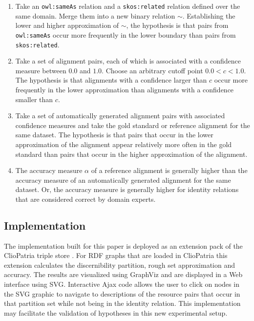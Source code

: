 \begin{enumerate}
\item Take an \verb|owl:sameAs| relation and a \verb|skos:related|
        relation defined over the same domain.
      Merge them into a new binary relation $\sim$.
      Establishing the lower and higher approximation of $\sim$,
        the hypothesis is that pairs from \verb|owl:sameAs| occur more
        frequently in the lower boundary than pairs from \verb|skos:related|.
\item Take a set of alignment pairs, each of which is associated with
        a confidence measure between $0.0$ and $1.0$.
      Choose an arbitrary cutoff point $0.0<c<1.0$.
      The hypothesis is that alignments with a confidence larger than $c$
        occur more frequently in the lower approximation than alignments
        with a confidence smaller than $c$.
\item Take a set of automatically generated alignment pairs with
        associated confidence measures and take the gold standard or
        reference alignment for the same dataset.
      The hypothesis is that pairs that occur in the lower approximation
        of the alignment appear relatively more often in the gold standard
        than pairs that occur in the higher approximation of the alignment.
\item The accuracy measure $\alpha$ of a reference alignment is generally
        higher than the accuracy measure of an automatically generated
        alignment for the same dataset.
      Or, the accuracy measure is generally higher for identity relations
        that are considered correct by domain experts.
\end{enumerate}

\subsection{Implementation}
\label{sec:implementation}

The implementation built for this paper is deployed as an extension pack
  of the ClioPatria triple store \cite{schreiber_2006}.
For RDF graphs that are loaded in ClioPatria this extension calculates
  the discernibility partition, rough set approximation and accuracy.
The results are visualized using GraphViz and are displayed in a
  Web interface using SVG.
Interactive Ajax code allows the user to click on nodes in the SVG graphic
  to navigate to descriptions of the resource pairs that occur in
  that partition set while not being in the identity relation.
This implementation may facilitate the validation of hypotheses in this
  new experimental setup.
